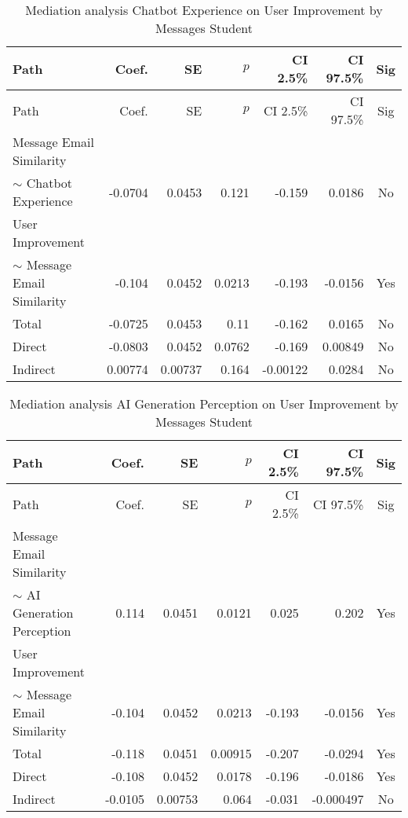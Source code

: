 \begin{longtable}{lrrrrrc}
            \caption{Mediation analysis Chatbot Experience on User Improvement by  Messages Student}\label{tab:mediation Chatbot Experience on User Improvement by  Messages Student}\\
            \toprule
            Path & Coef. & SE & $p$ & CI 2.5\% & CI 97.5\% & Sig \\
            \midrule
            \endfirsthead
            \toprule
            Path & Coef. & SE & $p$ & CI 2.5\% & CI 97.5\% & Sig \\
            \midrule
            \endhead
            \bottomrule
            \endfoot
            Message Email Similarity\\ $\sim$ Chatbot Experience & -0.0704 & 0.0453 & 0.121 & -0.159 & 0.0186 & No \\
User Improvement\\ $\sim$ Message Email Similarity & -0.104 & 0.0452 & 0.0213 & -0.193 & -0.0156 & Yes \\
Total & -0.0725 & 0.0453 & 0.11 & -0.162 & 0.0165 & No \\
Direct & -0.0803 & 0.0452 & 0.0762 & -0.169 & 0.00849 & No \\
Indirect & 0.00774 & 0.00737 & 0.164 & -0.00122 & 0.0284 & No \\
\end{longtable}

\begin{longtable}{lrrrrrc}
            \caption{Mediation analysis AI Generation Perception on User Improvement by  Messages Student}\label{tab:mediation AI Generation Perception on User Improvement by  Messages Student}\\
            \toprule
            Path & Coef. & SE & $p$ & CI 2.5\% & CI 97.5\% & Sig \\
            \midrule
            \endfirsthead
            \toprule
            Path & Coef. & SE & $p$ & CI 2.5\% & CI 97.5\% & Sig \\
            \midrule
            \endhead
            \bottomrule
            \endfoot
            Message Email Similarity\\ $\sim$ AI Generation Perception & 0.114 & 0.0451 & 0.0121 & 0.025 & 0.202 & Yes \\
User Improvement\\ $\sim$ Message Email Similarity & -0.104 & 0.0452 & 0.0213 & -0.193 & -0.0156 & Yes \\
Total & -0.118 & 0.0451 & 0.00915 & -0.207 & -0.0294 & Yes \\
Direct & -0.108 & 0.0452 & 0.0178 & -0.196 & -0.0186 & Yes \\
Indirect & -0.0105 & 0.00753 & 0.064 & -0.031 & -0.000497 & No \\
\end{longtable}

